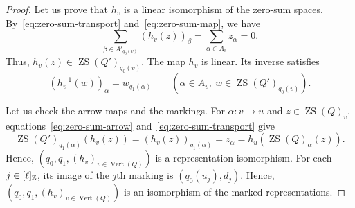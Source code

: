 \begin{proof}
Let us prove that $h_v$ is a linear isomorphism of the zero-sum spaces.
By~\eqref{eq:zero-sum-transport} and~\eqref{eq:zero-sum-map}, we have
\[
 \sum_{\beta\in A'_{q_0(v)}}(h_v(z))_\beta
 =\sum_{\alpha\in A_v}z_\alpha=0.
\]
Thus, $h_v(z)\in\operatorname{ZS}(Q')_{q_0(v)}$.
The map $h_v$ is linear. Its inverse satisfies
\[
 (h_v^{-1}(w))_\alpha=w_{q_1(\alpha)}
 \qquad(\alpha\in A_v,\ w\in\operatorname{ZS}(Q')_{q_0(v)}).
\]

Let us check the arrow maps and the markings.
For $\alpha:v\to u$ and $z\in\operatorname{ZS}(Q)_v$, equations~\eqref{eq:zero-sum-arrow} and~\eqref{eq:zero-sum-transport} give
\[
 \operatorname{ZS}(Q')_{q_1(\alpha)}(h_v(z))
 =(h_v(z))_{q_1(\alpha)}
 =z_\alpha
 =h_u(\operatorname{ZS}(Q)_\alpha(z)).
\]
Hence, $(q_0,q_1,(h_v)_{v\in\operatorname{Vert}(Q)})$ is a representation isomorphism.
For each $j\in[\ell]_{\mathbb Z}$, its image of the $j$th marking is $(q_0(u_j),d_j)$.
Hence, $(q_0,q_1,(h_v)_{v\in\operatorname{Vert}(Q)})$ is an isomorphism of the marked representations.
\end{proof}

